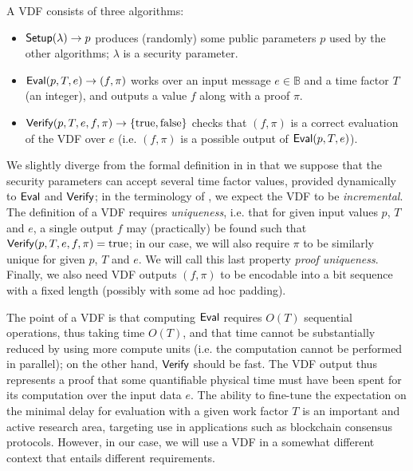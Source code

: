 \documentclass{llncs}
\newcommand{\bB}{\mathbb{B}}
\newcommand{\Setup}{\text{\textsf{Setup}}}
\newcommand{\Eval}{\text{\textsf{Eval}}}
\newcommand{\Verify}{\text{\textsf{Verify}}}
\begin{document}
A VDF consists of three algorithms:
\begin{itemize}

    \item $\Setup(\lambda) \rightarrow p$ produces (randomly) some
    public parameters $p$ used by the other algorithms; $\lambda$
    is a security parameter.

    \item $\Eval(p, T, e) \rightarrow (f, \pi)$ works over an input
    message $e \in \bB$ and a time factor $T$ (an integer), and outputs
    a value $f$ along with a proof $\pi$.

    \item $\Verify(p, T, e, f, \pi) \rightarrow \{ \text{true}, \text{false} \}$
    checks that $(f, \pi)$ is a correct evaluation of the VDF over $e$
    (i.e. $(f, \pi)$ is a possible output of $\Eval(p, T, e)$).

\end{itemize}
We slightly diverge from the formal definition in
\cite{BonBonBunFis2018} in that we suppose that the security parameters
can accept several time factor values, provided dynamically to $\Eval$
and $\Verify$; in the terminology of \cite{BonBonBunFis2018}, we expect
the VDF to be \emph{incremental}. The definition of a VDF requires
\emph{uniqueness}, i.e. that for given input values $p$, $T$ and $e$, a
single output $f$ may (practically) be found such that $\Verify(p, T, e,
f, \pi) = \text{true}$; in our case, we will also require $\pi$ to be
similarly unique for given $p$, $T$ and $e$. We will call this last
property \emph{proof uniqueness}. Finally, we also need VDF outputs $(f,
\pi)$ to be encodable into a bit sequence with a fixed length (possibly
with some ad hoc padding).

The point of a VDF is that computing $\Eval$ requires $O(T)$ sequential
operations, thus taking time $O(T)$, and that time cannot be
substantially reduced by using more compute units (i.e. the computation
cannot be performed in parallel); on the other hand, $\Verify$ should be
fast. The VDF output thus represents a proof that some quantifiable
physical time must have been spent for its computation over the input
data $e$. The ability to fine-tune the expectation on the minimal delay
for evaluation with a given work factor $T$ is an important and active
research area, targeting use in applications such as blockchain
consensus protocols. However, in our case, we will use a VDF in a
somewhat different context that entails different requirements.
\end{document}
